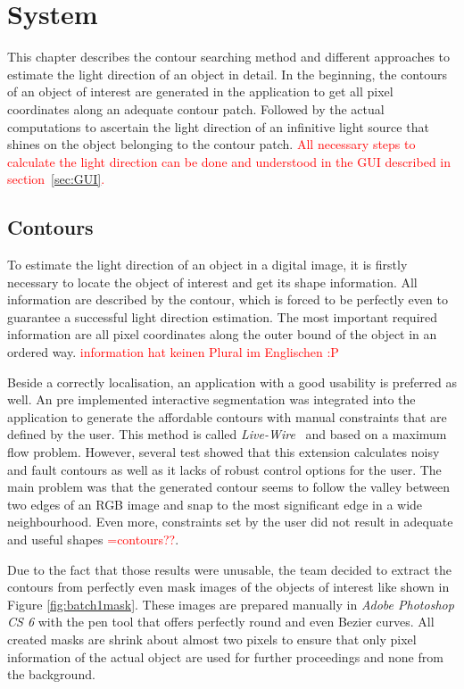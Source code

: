 \section{System}\label{sec:System}
This chapter describes the contour searching method and different approaches to estimate the light direction of an object in detail. In the beginning, the contours of an object of interest are generated in the application to get all pixel coordinates along an adequate contour patch. Followed by the actual computations to ascertain the light direction of an infinitive light source that shines on the object belonging to the contour patch.
\textcolor{red}{All necessary steps to calculate the light direction can be done and understood in the GUI described in section~\ref{sec:GUI}.}

\subsection{Contours}\label{sec:contours}
To estimate the light direction of an object in a digital image, it is firstly necessary to locate the object of interest and get its shape information. All information are described by the contour, which is forced to be perfectly even to guarantee a successful light direction estimation. The most important required information are all pixel coordinates along the outer bound of the object in an ordered way. \textcolor{red}{information hat keinen Plural im Englischen :P}

Beside a correctly localisation, an application with a good usability is preferred as well. An pre implemented interactive segmentation \cite{website:LiveWire} was integrated into the application to generate the affordable contours with manual constraints that are defined by the user. This method is called \textit{Live-Wire}~\cite{BARRETT1997331} and based on a maximum flow problem. However, several test showed that this extension calculates noisy and fault contours as well as it lacks of robust control options for the user. The main problem was that the generated contour seems to follow the valley between two edges of an RGB image and snap to the most significant edge in a wide neighbourhood. Even more, constraints set by the user did not result in adequate and useful shapes \textcolor{red}{=contours??}. 

Due to the fact that those results were unusable, the team decided to extract the contours from perfectly even mask images of the objects of interest like shown in Figure \ref{fig:batch1mask}. These images are prepared manually in \textit{Adobe Photoshop CS 6} with the pen tool that offers perfectly round and even Bezier curves. All created masks are shrink about almost two pixels to ensure that only pixel information of the actual object are used for further proceedings and none from the background. 

